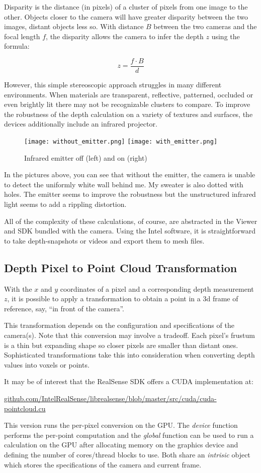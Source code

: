  Disparity is the distance (in pixels) of a cluster of pixels from one image to the other.
 Objects closer to the camera will have greater disparity between the two images, distant
 objects less so.
 With distance $B$ between the two cameras and the focal length $f$, the disparity allows the camera
 to infer the depth $z$ using the formula:

 \[ z = \frac{f \cdot B}{d} \]

 However, this simple stereoscopic approach struggles in many different
 environments. When materials are transparent, reflective, patterned, occluded or
 even brightly lit there may not be recognizable clusters to compare.
 To improve the robustness of the depth calculation on a variety
 of textures and surfaces, the devices additionally include an infrared projector.

 \begin{figure}[h]
 \centering
 \texttt{[image: without\_emitter.png]}
 \texttt{[image: with\_emitter.png]}
 \caption{Infrared emitter off (left) and on (right)}
 \end{figure}

 In the pictures above, you can see that without the emitter, the camera is
 unable to detect the uniformly white wall behind me. My sweater is also dotted with
 holes. The emitter seems to improve the robustness but  the unstructured infrared light
 seems to add a rippling distortion.

 All of the complexity of these calculations, of course, are abstracted in the Viewer
 and SDK bundled with the camera.
 Using the Intel software, it is straightforward to take depth-snapshots or videos
 and export them to mesh files.

 \subsection{Depth Pixel to Point Cloud Transformation}
 With the $x$ and $y$ coordinates of a pixel and a corresponding depth measurement $z$,
 it is possible to apply a transformation to obtain a point in a 3d frame of
 reference, say, ``in front of the camera''.

 This transformation depends on the configuration and specifications of the camera(s).
 Note that this conversion may involve a tradeoff. Each pixel's frustum is a thin but expanding shape so closer pixels are smaller than distant ones. Sophisticated transformations take this into consideration when converting depth values into voxels or points.

 It may be of interest that the RealSense SDK offers a CUDA implementation at:

 \url{github.com/IntelRealSense/librealsense/blob/master/src/cuda/cuda-pointcloud.cu}

 This version runs the per-pixel conversion on the GPU. The \textit{device} function
 performs the per-point computation and the \textit{global} function
 can be used to run a calculation on the GPU after allocating memory on the graphics device and
 defining the number of cores/thread blocks to use. Both share an \textit{intrisic} object which stores the specifications of the camera and current frame.
